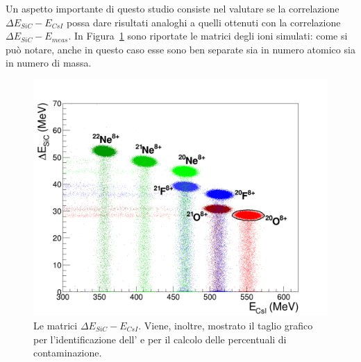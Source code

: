 Un aspetto importante di questo studio consiste nel valutare se la correlazione $\Delta E_{SiC} - E_{CsI}$ possa dare risultati analoghi a quelli ottenuti con la correlazione $\Delta E_{SiC} - E_{meas}$. 
In Figura~\ref{fig:deltaE_Ecsi} sono riportate le matrici degli ioni simulati: come si può notare, anche in questo caso esse sono ben separate sia in numero atomico sia in numero di massa.
\begin{figure} [!p]
	\centering
	\includegraphics[width=\textwidth, keepaspectratio]{Grafici_Tesi2/PIDnew/deltaE_Ecsi_quadrata_taglio_menoeventi2.png}
	\caption{Le matrici $\Delta E_{SiC} - E_{CsI}$. Viene, inoltre, mostrato il taglio grafico per l'identificazione dell' e per il calcolo delle percentuali di contaminazione.} \label{fig:deltaE_Ecsi}
\end{figure}
